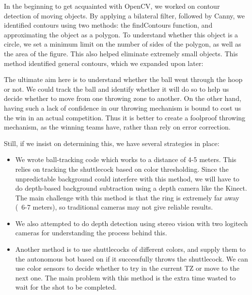\documentclass[11pt]{article}
\begin{document}
In the beginning to get acquainted with OpenCV, we worked on contour detection of moving objects. By applying a bilateral filter, followed by Canny, we identified contours using two methods: the findContours function, and approximating the object as a polygon. To understand whether this object is a circle, we set a minimum limit on the number of sides of the polygon, as well as the area of the figure. This also helped eliminate extremely small objects. This method identified general contours, which we expanded upon later:

The ultimate aim here is to understand whether the ball went through the hoop or not. We could track the ball and identify whether it will do so to help us decide whether to move from one throwing zone to another. On the other hand, having such a lack of confidence in our throwing mechanism is bound to cost us the win in an actual competition. Thus it is better to create a foolproof throwing mechanism, as the winning teams have, rather than rely on error correction.

Still, if we insist on determining this, we have several strategies in place:

\begin{itemize}
\item{We wrote ball-tracking code which works to a distance of 4-5 meters. This relies on tracking the shuttlecock based on color thresholding. Since the unpredictable background could interfere with this method, we will have to do depth-based background subtraction using a depth camera like the Kinect. The main challenge with this method is that the ring is extremely far away (~6-7 meters), so traditional cameras may not give reliable results.}

\item{We also attempted to do depth detection using stereo vision with two logitech cameras for understanding the process behind this.}

\item{Another method is to use shuttlecocks of different colors, and supply them to the autonomous bot based on if it successfully throws the shuttlecock. We can use color sensors to decide whether to try in the current TZ or move to the next one. The main problem with this method is the extra time wasted to wait for the shot to be completed.}
\end{itemize}
\end{document}
